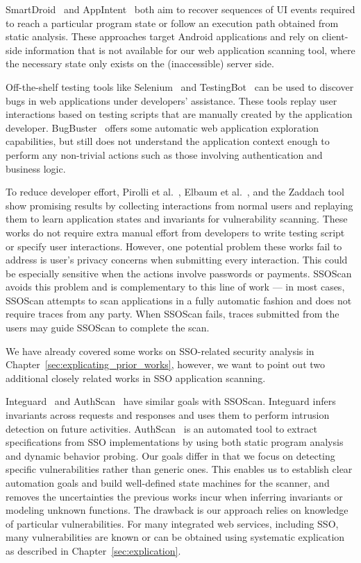 SmartDroid~\cite{Zheng:2012:SAS:2381934.2381950} and AppIntent~\cite{Yang:2013:AAS:2541806.2516676} both aim to recover sequences of UI events required to reach a particular program state or follow an execution path obtained from static analysis.  These approaches target Android applications and rely on client-side information that is not available for our web application scanning tool, where the necessary state only exists on the (inaccessible) server side.

 Off-the-shelf testing tools like Selenium~\cite{Selenium} and TestingBot~\cite{TestingBot} can be used to discover bugs in web applications under developers' assistance.  These tools replay user interactions based on testing scripts that are manually created by the application developer.  BugBuster~\cite{BugBuster} offers some automatic web application exploration capabilities, but still does not understand the application context enough to perform any non-trivial actions such as those involving authentication and business logic.

To reduce developer effort, Pirolli et al.~\cite{Pirolli:2002:UAM:1556262.1556272}, Elbaum et al.~\cite{Elbaum:2003:IWA:776816.776823}, and the Zaddach tool~\cite{zaddach:ndss14} show promising results by collecting interactions from normal users and replaying them to learn application states and invariants for vulnerability scanning.  These works do not require extra manual effort from developers to write testing script or specify user interactions.  However, one potential problem these works fail to address is user's privacy concerns when submitting every interaction.  This could be especially sensitive when the actions involve passwords or payments.  SSOScan avoids this problem and is complementary to this line of work --- in most cases, SSOScan attempts to scan applications in a fully automatic fashion and does not require traces from any party.  When SSOScan fails, traces submitted from the users may guide SSOScan to complete the scan.

 We have already covered some works on SSO-related security analysis in Chapter~\ref{sec:explicating_prior_works}, however, we want to point out two additional closely related works in SSO application scanning.

Integuard~\cite{Integuard} and AuthScan~\cite{AuthScan} have similar goals with SSOScan.  Integuard infers invariants across requests and responses and uses them to perform intrusion detection on future activities.  AuthScan~\cite{AuthScan} is an automated tool to extract specifications from SSO implementations by using both static program analysis and dynamic behavior probing.  Our goals differ in that we focus on detecting specific vulnerabilities rather than generic ones.  This enables us to establish clear automation goals and build well-defined state machines for the scanner, and removes the uncertainties the previous works incur when inferring invariants or modeling unknown functions.  The drawback is our approach relies on knowledge of particular vulnerabilities.  For many integrated web services, including SSO, many vulnerabilities are known or can be obtained using systematic explication as described in Chapter~\ref{sec:explication}.

